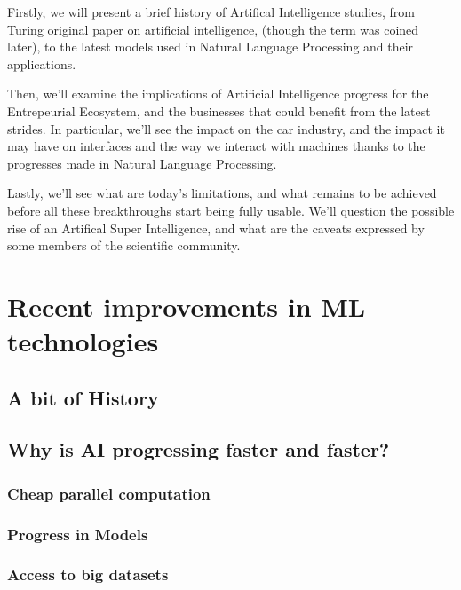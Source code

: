 \documentclass[12pt]{article}
\begin{document}
Firstly, we will present a brief history of Artifical
Intelligence studies, from Turing original paper on artificial intelligence,
(though the term was coined later), to the latest models used in Natural
Language Processing and their applications.

\noindent Then, we'll examine the implications of Artificial Intelligence
progress for the Entrepeurial Ecosystem, and the businesses that could benefit
from the latest strides. In particular, we'll see the impact on the car
industry, and the impact it may have on interfaces and the way we interact with
machines thanks to the progresses made in Natural Language Processing.

\noindent Lastly, we'll see what are today's limitations, and what remains to be
achieved before all these breakthroughs start being fully usable. We'll question
the possible rise of an Artifical Super Intelligence, and what are the caveats
expressed by some members of the scientific community.

\pagebreak


\section{Recent improvements in ML technologies}

\subsection{A bit of History}


\subsection{Why is AI progressing faster and faster?}

\subsubsection{Cheap parallel computation}

\subsubsection{Progress in Models}

\subsubsection{Access to big datasets}
\end{document}
